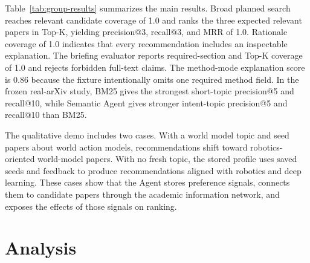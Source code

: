 \documentclass{article}
\begin{document}
Table~\ref{tab:group-results} summarizes the main results. Broad planned search reaches relevant candidate coverage of 1.0 and ranks the three expected relevant papers in Top-K, yielding precision@3, recall@3, and MRR of 1.0. Rationale coverage of 1.0 indicates that every recommendation includes an inspectable explanation. The briefing evaluator reports required-section and Top-K coverage of 1.0 and rejects forbidden full-text claims. The method-mode explanation score is 0.86 because the fixture intentionally omits one required method field. In the frozen real-arXiv study, BM25 gives the strongest short-topic precision@5 and recall@10, while Semantic Agent gives stronger intent-topic precision@5 and recall@10 than BM25.

The qualitative demo includes two cases. With a world model topic and seed papers about world action models, recommendations shift toward robotics-oriented world-model papers. With no fresh topic, the stored profile uses saved seeds and feedback to produce recommendations aligned with robotics and deep learning. These cases show that the Agent stores preference signals, connects them to candidate papers through the academic information network, and exposes the effects of those signals on ranking.

\section{Analysis}

\begin{table}[t]
  \centering
  \caption{Quantitative ablation summary. Each row uses deterministic fixtures or trace counters from the implemented workflow.}
  \label{tab:ablations}
\end{table}
\end{document}
